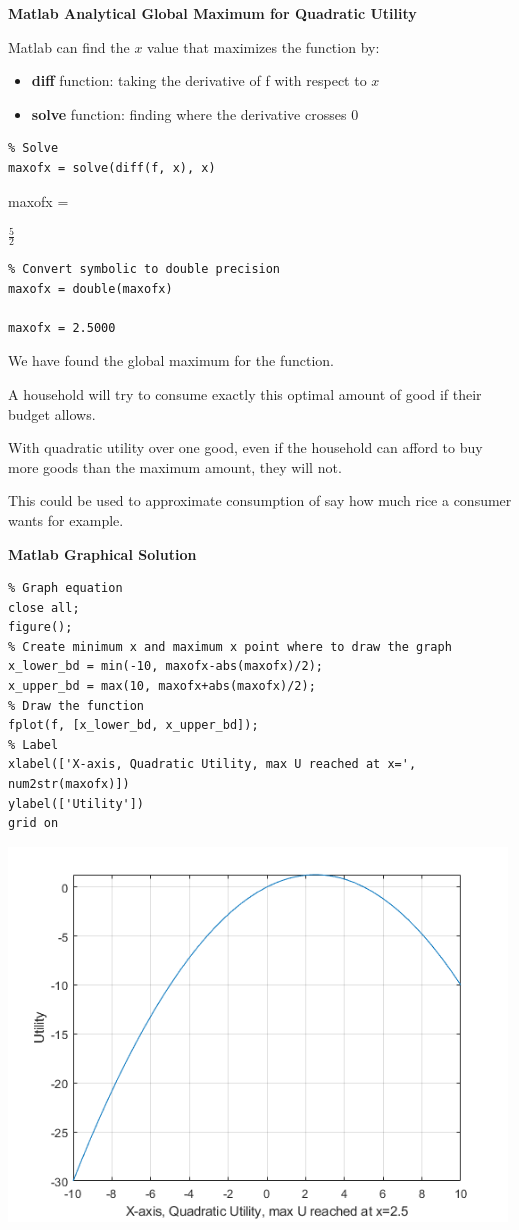 \documentclass[
]{book}
\begin{document}
\textbf{Matlab Analytical Global Maximum for Quadratic Utility}

Matlab can find the \(x\) value that maximizes the function by:

\begin{itemize}
\item
  \textbf{diff} function: taking the derivative of f with respect to \(x\)
\item
  \textbf{solve} function: finding where the derivative crosses \(0\)
\end{itemize}

\begin{verbatim}
% Solve
maxofx = solve(diff(f, x), x)
\end{verbatim}

maxofx =

\(\displaystyle \frac{5}{2}\)

\begin{verbatim}
% Convert symbolic to double precision
maxofx = double(maxofx)

maxofx = 2.5000
\end{verbatim}

We have found the global maximum for the function.

A household will try to consume exactly this optimal amount of good if
their budget allows.

With quadratic utility over one good, even if the household can afford
to buy more goods than the maximum amount, they will not.

This could be used to approximate consumption of say how much rice a
consumer wants for example.

\textbf{Matlab Graphical Solution}

\begin{verbatim}
% Graph equation
close all;
figure();
% Create minimum x and maximum x point where to draw the graph
x_lower_bd = min(-10, maxofx-abs(maxofx)/2);
x_upper_bd = max(10, maxofx+abs(maxofx)/2);
% Draw the function
fplot(f, [x_lower_bd, x_upper_bd]);
% Label
xlabel(['X-axis, Quadratic Utility, max U reached at x=', num2str(maxofx)])
ylabel(['Utility'])
grid on
\end{verbatim}

\includegraphics[width=5.20833in,height=\textheight]{img/localglobal_images/figure_0.png}
\end{document}
